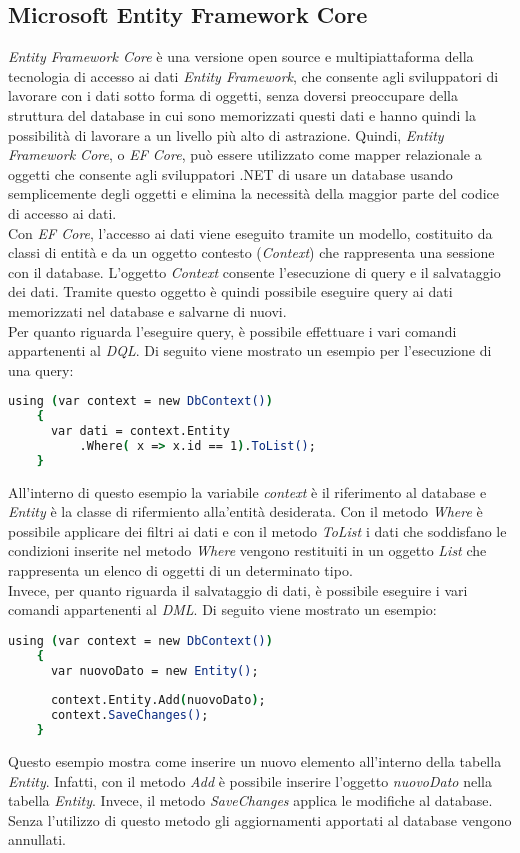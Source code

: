  \subsection{Microsoft Entity Framework Core}
  \textit{Entity Framework Core} è una versione open source e multipiattaforma della tecnologia di accesso ai dati \textit{Entity
  Framework}, che consente agli sviluppatori di lavorare con i dati sotto forma di oggetti, senza doversi preoccupare della 
  struttura del database in cui sono memorizzati questi dati e hanno quindi la possibilità di lavorare a un livello più
  alto di astrazione. Quindi, \textit{Entity Framework Core}, o \textit{EF Core}, può essere utilizzato come mapper relazionale
  a oggetti che consente agli sviluppatori .NET di usare un database usando semplicemente degli oggetti e elimina la necessità
  della maggior parte del codice di accesso ai dati.\\
  Con \textit{EF Core}, l'accesso ai dati viene eseguito tramite un modello, costituito da classi di entità
  e da un oggetto contesto (\textit{Context}) che rappresenta una sessione con il database. L'oggetto \textit{Context}
  consente l'esecuzione di query e il salvataggio dei dati. Tramite questo oggetto è quindi possibile eseguire query ai dati
  memorizzati nel database e salvarne di nuovi.\\Per quanto riguarda l'eseguire query, è possibile effettuare i vari comandi
  appartenenti al \textit{DQL}. Di seguito viene mostrato un esempio per l'esecuzione di una query:
  \begin{lstlisting}[language=csh]
    using (var context = new DbContext())
    {
      var dati = context.Entity
          .Where( x => x.id == 1).ToList();
    }
  \end{lstlisting}
  All'interno di questo esempio la variabile \textit{context} è il riferimento al database e \textit{Entity} è
  la classe di rifermiento alla'entità desiderata. Con il metodo \textit{Where} è possibile applicare dei filtri ai dati
  e con il metodo \textit{ToList} i dati che soddisfano le condizioni inserite nel metodo \textit{Where} vengono restituiti in
  un oggetto \textit{List} che rappresenta un elenco di oggetti di un determinato tipo.\\
  Invece, per quanto riguarda il salvataggio di dati, è possibile eseguire i vari comandi appartenenti al \textit{DML}. Di
  seguito viene mostrato un esempio:
  \begin{lstlisting}[language=csh]
    using (var context = new DbContext())
    {
      var nuovoDato = new Entity();
      
      context.Entity.Add(nuovoDato);
      context.SaveChanges();
    }
  \end{lstlisting}
  Questo esempio mostra come inserire un nuovo elemento all'interno della tabella \textit{Entity}. Infatti, con il metodo
  \textit{Add} è possibile inserire l'oggetto \textit{nuovoDato} nella tabella \textit{Entity}. Invece, il metodo
  \textit{SaveChanges} applica le modifiche al database. Senza l'utilizzo di questo metodo gli aggiornamenti apportati al
  database vengono annullati.